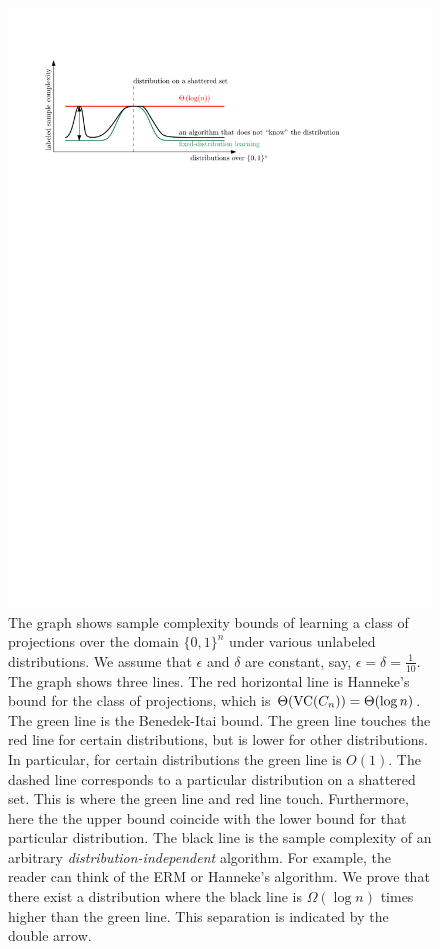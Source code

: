 \begin{figure}
\centering
\includegraphics{figure}
\caption{\small The graph shows sample complexity bounds of learning a class of
projections over the domain $\{0,1\}^n$ under various unlabeled distributions.
We assume that $\epsilon$ and $\delta$ are constant, say, $\epsilon = \delta =
\frac{1}{10}$. The graph shows three lines. The red horizontal line is
Hanneke's bound for the class of projections, which is $\Theta(\operatorname{VC}(C_n)) =
\Theta(\log n)$. The green line is the Benedek-Itai bound. The green
line touches the red line for certain distributions, but is lower for other
distributions. In particular, for certain distributions the green line is
$O(1)$. The dashed line corresponds to a particular distribution on a shattered
set. This is where the green line and red line touch. Furthermore, here the the
upper bound coincide with the lower bound for that particular distribution. The
black line is the sample complexity of an arbitrary
\emph{distribution-independent} algorithm. For example, the reader can think of
the ERM or Hanneke's algorithm.
We prove that there exist a distribution where the black line is
$\Omega(\log n)$ times higher than the green line. This separation is indicated
by the double arrow.}
\label{figure:sample-complexity}
\end{figure}

